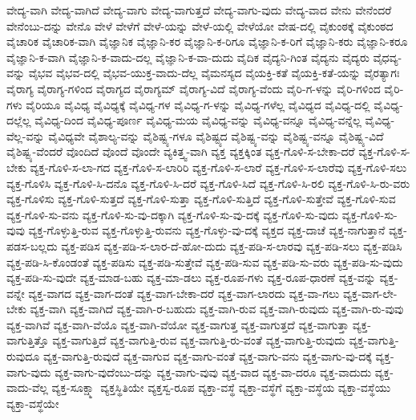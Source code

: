 {ವೇದ್ಯ-ವಾಗಿ
ವೇದ್ಯ-ವಾಗಿದೆ
ವೇದ್ಯ-ವಾಗು
ವೇದ್ಯ-ವಾಗುತ್ತದೆ
ವೇದ್ಯ-ವಾಗು-ವುದು
ವೇದ್ಯ-ವಾದ
ವೇನು
ವೇನೆಂದರೆ
ವೇನೆಂಬು-ದನ್ನು
ವೇನೊ
ವೇಳೆ
ವೇಳೆಗೆ
ವೇಳೆ-ಯನ್ನು
ವೇಳೆ-ಯಲ್ಲಿ
ವೇಳೆಯೋ
ವೇಷ-ದಲ್ಲಿ
ವೈಕುಂಠಕ್ಕೆ
ವೈಕುಂಠದ
ವೈಚಾರಿಕ
ವೈಚಾರಿಕ-ವಾಗಿ
ವೈಜ್ಞಾನಿಕ
ವೈಜ್ಞಾನಿ-ಕರ
ವೈಜ್ಞಾನಿ-ಕ-ರಿಗೂ
ವೈಜ್ಞಾನಿ-ಕ-ರಿಗೆ
ವೈಜ್ಞಾನಿ-ಕರು
ವೈಜ್ಞಾನಿ-ಕರೂ
ವೈಜ್ಞಾನಿ-ಕ-ವಾಗಿ
ವೈಜ್ಞಾನಿ-ಕ-ವಾದು-ದಲ್ಲ
ವೈಜ್ಞಾನಿ-ಕ-ವಾ-ದುದು
ವೈದಿಕ
ವೈದ್ಯನಿ-ಗಿಂತ
ವೈದ್ಯನು
ವೈದ್ಯರು
ವೈಧವ್ಯ-ವನ್ನು
ವೈಭವ
ವೈಭವ-ದಲ್ಲಿ
ವೈಭವ-ಯುಕ್ತ-ವಾದು-ದೆಲ್ಲ
ವೈಮನಸ್ಯದ
ವೈಯಕ್ತಿ-ಕತೆ
ವೈಯಕ್ತಿ-ಕತೆ-ಯನ್ನು
ವೈರತ್ಯಾಗಃ
ವೈರಾಗ್ಯ
ವೈರಾಗ್ಯ-ಗಳಿಂದ
ವೈರಾಗ್ಯದ
ವೈರಾಗ್ಯಮ್
ವೈರಾಗ್ಯ-ವಿದೆ
ವೈರಾಗ್ಯ-ವೆಂದು
ವೈರಿ-ಗ-ಳನ್ನು
ವೈರಿ-ಗಳಿಂದ
ವೈರಿ-ಗಳು
ವೈರಿಯೂ
ವೈವಿಧ್ಯ
ವೈವಿಧ್ಯಕ್ಕೆ
ವೈವಿಧ್ಯ-ಗಳ
ವೈವಿಧ್ಯ-ಗ-ಳನ್ನು
ವೈವಿಧ್ಯ-ಗಳೆಲ್ಲ
ವೈವಿಧ್ಯದ
ವೈವಿಧ್ಯ-ದಲ್ಲಿ
ವೈವಿಧ್ಯ-ದಲ್ಲೆಲ್ಲ
ವೈವಿಧ್ಯ-ದಿಂದ
ವೈವಿಧ್ಯ-ಪೂರ್ಣ
ವೈವಿಧ್ಯ-ಮಯ
ವೈವಿಧ್ಯ-ವನ್ನು
ವೈವಿಧ್ಯ-ವನ್ನೂ
ವೈವಿಧ್ಯ-ವನ್ನೆಲ್ಲ
ವೈವಿಧ್ಯ-ವೆಲ್ಲ-ವನ್ನು
ವೈವಿಧ್ಯವೇ
ವೈಶಾಲ್ಯ-ವನ್ನು
ವೈಶಿಷ್ಟ್ಯ-ಗಳೂ
ವೈಶಿಷ್ಟ್ಯದ
ವೈಶಿಷ್ಟ್ಯ-ವನ್ನು
ವೈಶಿಷ್ಟ್ಯ-ವನ್ನೂ
ವೈಶಿಷ್ಟ್ಯ-ವಿದೆ
ವೈಶಿಷ್ಟ್ಯ-ವೆಂದರೆ
ವೊಂದಿದೆ
ವೊಂದೆ
ವೊಂದೇ
ವ್ಯಕಿತ್ತ್ವ-ವಾಗಿ
ವ್ಯಕ್ತ
ವ್ಯಕ್ತಕ್ಕಿಂತ
ವ್ಯಕ್ತ-ಗೊಳಿ-ಸ-ಬೇಕಾ-ದರೆ
ವ್ಯಕ್ತ-ಗೊಳಿ-ಸ-ಬೇಕು
ವ್ಯಕ್ತ-ಗೊಳಿ-ಸ-ಲಾ-ಗದ
ವ್ಯಕ್ತ-ಗೊಳಿ-ಸ-ಲಾರಿರಿ
ವ್ಯಕ್ತ-ಗೊಳಿ-ಸ-ಲಾರೆ
ವ್ಯಕ್ತ-ಗೊಳಿ-ಸ-ಲಾರೆವು
ವ್ಯಕ್ತ-ಗೊಳಿ-ಸಲು
ವ್ಯಕ್ತ-ಗೊಳಿಸಿ
ವ್ಯಕ್ತ-ಗೊಳಿ-ಸಿ-ದನೊ
ವ್ಯಕ್ತ-ಗೊಳಿ-ಸಿ-ದರೆ
ವ್ಯಕ್ತ-ಗೊಳಿ-ಸಿದೆ
ವ್ಯಕ್ತ-ಗೊಳಿ-ಸಿ-ರಲಿ
ವ್ಯಕ್ತ-ಗೊಳಿ-ಸಿ-ರು-ವರು
ವ್ಯಕ್ತ-ಗೊಳಿಸು
ವ್ಯಕ್ತ-ಗೊಳಿ-ಸುತ್ತದೆ
ವ್ಯಕ್ತ-ಗೊಳಿ-ಸುತ್ತಾ
ವ್ಯಕ್ತ-ಗೊಳಿ-ಸುತ್ತಿದೆ
ವ್ಯಕ್ತ-ಗೊಳಿ-ಸುತ್ತೇವೆ
ವ್ಯಕ್ತ-ಗೊಳಿ-ಸುವ
ವ್ಯಕ್ತ-ಗೊಳಿ-ಸು-ವನು
ವ್ಯಕ್ತ-ಗೊಳಿ-ಸು-ವು-ದಕ್ಕಾಗಿ
ವ್ಯಕ್ತ-ಗೊಳಿ-ಸು-ವು-ದಕ್ಕೆ
ವ್ಯಕ್ತ-ಗೊಳಿ-ಸು-ವುದು
ವ್ಯಕ್ತ-ಗೊಳಿ-ಸು-ವುವು
ವ್ಯಕ್ತ-ಗೊಳ್ಳುತ್ತಿ-ರುವ
ವ್ಯಕ್ತ-ಗೊಳ್ಳುತ್ತಿ-ರುವನು
ವ್ಯಕ್ತ-ಗೊಳ್ಳು-ವು-ದಕ್ಕೆ
ವ್ಯಕ್ತದ
ವ್ಯಕ್ತ-ದಾಚೆ
ವ್ಯಕ್ತ-ನಾಗುತ್ತಾನೆ
ವ್ಯಕ್ತ-ಪಡಸ-ಬಲ್ಲದು
ವ್ಯಕ್ತ-ಪಡಿಸ
ವ್ಯಕ್ತ-ಪಡಿ-ಸ-ಲಾರ-ದೆ-ಹೋ-ದುದು
ವ್ಯಕ್ತ-ಪಡಿ-ಸ-ಲಾರವು
ವ್ಯಕ್ತ-ಪಡಿ-ಸಲು
ವ್ಯಕ್ತ-ಪಡಿಸಿ
ವ್ಯಕ್ತ-ಪಡಿ-ಸಿ-ಕೊಂಡಂತೆ
ವ್ಯಕ್ತ-ಪಡಿಸು
ವ್ಯಕ್ತ-ಪಡಿ-ಸುತ್ತೇವೆ
ವ್ಯಕ್ತ-ಪಡಿ-ಸುವ
ವ್ಯಕ್ತ-ಪಡಿ-ಸು-ವರು
ವ್ಯಕ್ತ-ಪಡಿ-ಸು-ವುದು
ವ್ಯಕ್ತ-ಪಡಿ-ಸು-ವುದೇ
ವ್ಯಕ್ತ-ಮಾಡ-ಬಹು
ವ್ಯಕ್ತ-ಮಾ-ಡಲು
ವ್ಯಕ್ತ-ರೂಪ-ಗಳು
ವ್ಯಕ್ತ-ರೂಪ-ಧಾರಣೆ
ವ್ಯಕ್ತ-ವನ್ನು
ವ್ಯಕ್ತ-ವನ್ನೇ
ವ್ಯಕ್ತ-ವಾಗದ
ವ್ಯಕ್ತ-ವಾಗ-ದಂತೆ
ವ್ಯಕ್ತ-ವಾಗ-ಬೇಕಾ-ದರೆ
ವ್ಯಕ್ತ-ವಾಗ-ಲಾರದು
ವ್ಯಕ್ತ-ವಾ-ಗಲು
ವ್ಯಕ್ತ-ವಾಗ-ಲೇ-ಬೇಕು
ವ್ಯಕ್ತ-ವಾಗಿ
ವ್ಯಕ್ತ-ವಾಗಿದೆ
ವ್ಯಕ್ತ-ವಾಗಿ-ರ-ಬಹುದು
ವ್ಯಕ್ತ-ವಾಗಿ-ರುವ
ವ್ಯಕ್ತ-ವಾಗಿ-ರುವುದು
ವ್ಯಕ್ತ-ವಾಗಿ-ರು-ವುವು
ವ್ಯಕ್ತ-ವಾಗಿವೆ
ವ್ಯಕ್ತ-ವಾಗಿ-ವೆಯೊ
ವ್ಯಕ್ತ-ವಾಗಿ-ವೆಯೋ
ವ್ಯಕ್ತ-ವಾಗುತ್ತ
ವ್ಯಕ್ತ-ವಾಗುತ್ತದೆ
ವ್ಯಕ್ತ-ವಾಗುತ್ತಾ
ವ್ಯಕ್ತ-ವಾಗುತ್ತಿತ್ತೊ
ವ್ಯಕ್ತ-ವಾಗುತ್ತಿದೆ
ವ್ಯಕ್ತ-ವಾಗುತ್ತಿ-ರುವ
ವ್ಯಕ್ತ-ವಾಗುತ್ತಿ-ರು-ವಂತೆ
ವ್ಯಕ್ತ-ವಾಗುತ್ತಿ-ರುವುದು
ವ್ಯಕ್ತ-ವಾಗುತ್ತಿ-ರುವುದೂ
ವ್ಯಕ್ತ-ವಾಗುತ್ತಿ-ರುವುದೆ
ವ್ಯಕ್ತ-ವಾಗುವ
ವ್ಯಕ್ತ-ವಾಗು-ವಂತೆ
ವ್ಯಕ್ತ-ವಾಗು-ವನು
ವ್ಯಕ್ತ-ವಾಗು-ವು-ದಕ್ಕೆ
ವ್ಯಕ್ತ-ವಾಗು-ವುದು
ವ್ಯಕ್ತ-ವಾಗು-ವುದೆಂಬು-ದನ್ನು
ವ್ಯಕ್ತ-ವಾಗು-ವುವು
ವ್ಯಕ್ತ-ವಾದ
ವ್ಯಕ್ತ-ವಾ-ದರೂ
ವ್ಯಕ್ತ-ವಾದುದು
ವ್ಯಕ್ತ-ವಾದು-ವೆಲ್ಲ
ವ್ಯಕ್ತ-ಸೂಕ್ಷ್ಮಾ
ವ್ಯಕ್ತಸ್ಥಿತಿಯೇ
ವ್ಯಕ್ತಸ್ವ-ರೂಪ
ವ್ಯಕ್ತಾ-ವಸ್ಥೆ
ವ್ಯಕ್ತಾ-ವಸ್ಥೆಗೆ
ವ್ಯಕ್ತಾ-ವಸ್ಥೆಯ
ವ್ಯಕ್ತಾ-ವಸ್ಥೆಯು
ವ್ಯಕ್ತಾ-ವಸ್ಥೆಯೇ
}
